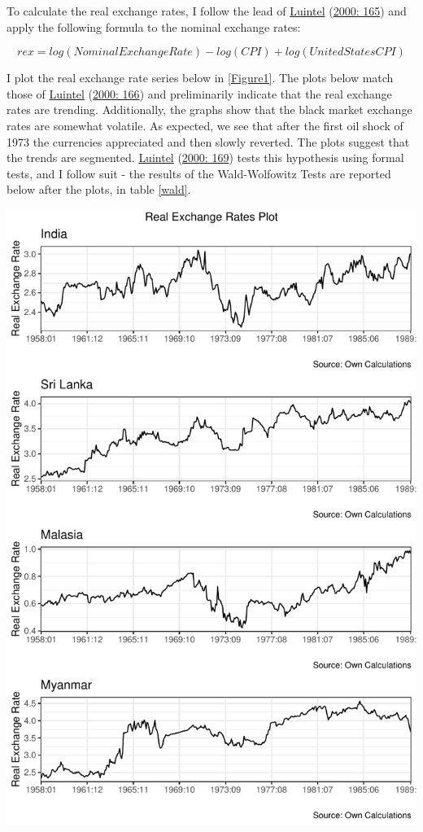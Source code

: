 \documentclass[11pt,preprint, authoryear]{elsarticle}
\numberwithin{equation}{section}
\numberwithin{figure}{section}
\numberwithin{table}{section}
\begin{document}
To calculate the real exchange rates, I follow the lead of
\protect\hyperlink{ref-Kul}{Luintel} (\protect\hyperlink{ref-Kul}{2000:
165}) and apply the following formula to the nominal exchange rates:

\[
rex = log(Nominal Exchange Rate) - log(CPI) + log(United States CPI)
\]

I plot the real exchange rate series below in \ref{Figure1}. The plots
below match those of \protect\hyperlink{ref-Kul}{Luintel}
(\protect\hyperlink{ref-Kul}{2000: 166}) and preliminarily indicate that
the real exchange rates are trending. Additionally, the graphs show that
the black market exchange rates are somewhat volatile. As expected, we
see that after the first oil shock of 1973 the currencies appreciated
and then slowly reverted. The plots suggest that the trends are
segmented. \protect\hyperlink{ref-Kul}{Luintel}
(\protect\hyperlink{ref-Kul}{2000: 169}) tests this hypothesis using
formal tests, and I follow suit - the results of the Wald-Wolfowitz
Tests are reported below after the plots, in table \ref{wald}.

\begin{center}\includegraphics{20346212_files/figure-latex/Figure1-1} \end{center}
\end{document}
